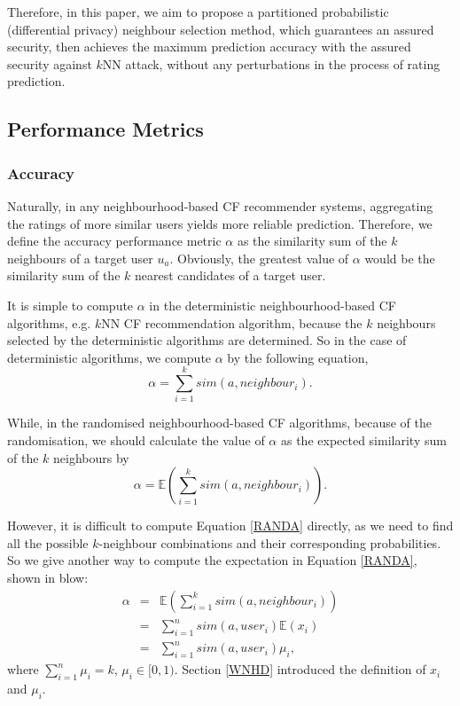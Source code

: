 \documentclass[11pt]{article}
\begin{document}
Therefore, in this paper, we aim to propose a partitioned probabilistic (differential privacy) neighbour selection method, which guarantees an assured security, then achieves the maximum prediction accuracy with the assured security against $k$NN attack, without any perturbations in the process of rating prediction.

\subsection{Performance Metrics}
\subsubsection{Accuracy}
Naturally, in any neighbourhood-based CF recommender systems, aggregating the ratings of more similar users yields more reliable prediction. Therefore, we define the accuracy performance metric $\alpha$ as the similarity sum of the $k$ neighbours of a target user $u_a$. Obviously, the greatest value of $\alpha$ would be the similarity sum of the $k$ nearest candidates of a target user.

It is simple to compute $\alpha$ in the deterministic neighbourhood-based CF algorithms, e.g. $k$NN CF recommendation algorithm, because the $k$ neighbours selected by the deterministic algorithms are determined. So in the case of deterministic algorithms, we compute $\alpha$ by the following equation,
\begin{equation}
\label{DETA}
\alpha=\sum_{i=1}^k{sim(a, neighbour_i)}.
\end{equation}

While, in the randomised neighbourhood-based CF algorithms, because of the randomisation, we should calculate the value of $\alpha$ as the expected similarity sum of the $k$ neighbours by
\begin{equation}
\label{RANDA}
\alpha=\mathbb{E}(\sum_{i=1}^k{sim(a,neighbour_i)}).
\end{equation}

However, it is difficult to compute Equation \eqref{RANDA} directly, as we need to find all the possible $k$-neighbour combinations and their corresponding probabilities. So we give another way to compute the expectation in Equation \eqref{RANDA}, shown in blow:
\begin{equation}
\label{EXPEC}
\begin{array}{ccl}
\alpha & = & \mathbb{E}(\sum_{i=1}^{k}{sim(a,neighbour_{i})})\\
 & = & \sum_{i=1}^{n}sim(a,user_{i})\mathbb{E}(x_{i})\\
 & = & \sum_{i=1}^{n}{sim(a,user_{i})\mu_{i}},
\end{array}
\end{equation}
where $\sum_{i=1}^n{\mu_{i}}=k$, $\mu_{i}\in [0,1)$. Section \ref{WNHD} introduced the definition of $x_i$ and $\mu_i$.
\end{document}
